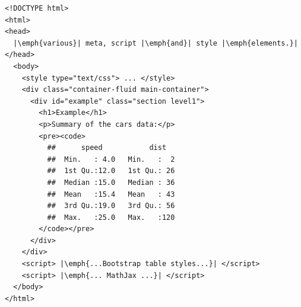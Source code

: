 \documentclass[a4paper, 12pt]{report}
\begin{document}
\begin{lstlisting}[caption={(tidied) \texttt{example2.html}}, escapechar=\|, label={lst:3.2}]
<!DOCTYPE html>
<html>
<head>
  |\emph{various}| meta, script |\emph{and}| style |\emph{elements.}|
</head>
  <body>
    <style type="text/css"> ... </style>
    <div class="container-fluid main-container">
      <div id="example" class="section level1">
        <h1>Example</h1>
        <p>Summary of the cars data:</p>
        <pre><code>
          ##      speed           dist    
    	  ##  Min.   : 4.0   Min.   :  2  
    	  ##  1st Qu.:12.0   1st Qu.: 26  
    	  ##  Median :15.0   Median : 36  
    	  ##  Mean   :15.4   Mean   : 43  
    	  ##  3rd Qu.:19.0   3rd Qu.: 56  
    	  ##  Max.   :25.0   Max.   :120
    	</code></pre>
      </div>
    </div>
    <script> |\emph{...Bootstrap table styles...}| </script>
    <script> |\emph{... MathJax ...}| </script>    
  </body>
</html>
\end{lstlisting}
\end{document}
